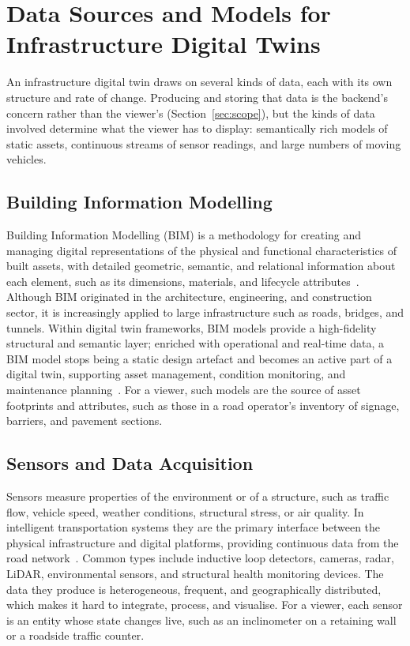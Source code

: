 \section{Data Sources and Models for Infrastructure Digital Twins}
\label{sec:dt-data}

An infrastructure digital twin draws on several kinds of data, each with its own structure and rate of change. Producing and storing that data is the backend's concern rather than the viewer's (Section~\ref{sec:scope}), but the kinds of data involved determine what the viewer has to display: semantically rich models of static assets, continuous streams of sensor readings, and large numbers of moving vehicles.

\subsection{Building Information Modelling}

Building Information Modelling (BIM) is a methodology for creating and managing digital representations of the physical and functional characteristics of built assets, with detailed geometric, semantic, and relational information about each element, such as its dimensions, materials, and lifecycle attributes~\cite{azhar2011bim}. Although BIM originated in the architecture, engineering, and construction sector, it is increasingly applied to large infrastructure such as roads, bridges, and tunnels. Within digital twin frameworks, BIM models provide a high-fidelity structural and semantic layer; enriched with operational and real-time data, a BIM model stops being a static design artefact and becomes an active part of a digital twin, supporting asset management, condition monitoring, and maintenance planning~\cite{deng2021bimdigitaltwins}. For a viewer, such models are the source of asset footprints and attributes, such as those in a road operator's inventory of signage, barriers, and pavement sections.

\subsection{Sensors and Data Acquisition}

Sensors measure properties of the environment or of a structure, such as traffic flow, vehicle speed, weather conditions, structural stress, or air quality. In intelligent transportation systems they are the primary interface between the physical infrastructure and digital platforms, providing continuous data from the road network~\cite{felemban2014its}. Common types include inductive loop detectors, cameras, radar, LiDAR, environmental sensors, and structural health monitoring devices. The data they produce is heterogeneous, frequent, and geographically distributed, which makes it hard to integrate, process, and visualise. For a viewer, each sensor is an entity whose state changes live, such as an inclinometer on a retaining wall or a roadside traffic counter.

